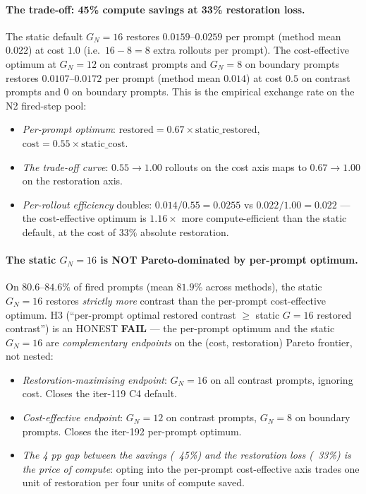 \paragraph{The trade-off: 45\% compute savings at 33\% restoration loss.}

The static default $G_N = 16$ restores $0.0159$--$0.0259$ per prompt
(method mean $0.022$) at cost $1.0$ (i.e.\ $16 - 8 = 8$ extra rollouts
per prompt). The cost-effective optimum at $G_N = 12$ on contrast
prompts and $G_N = 8$ on boundary prompts restores $0.0107$--$0.0172$
per prompt (method mean $0.014$) at cost $0.5$ on contrast prompts
and $0$ on boundary prompts. This is the empirical exchange rate on
the N2 fired-step pool:

\begin{itemize}
\item \emph{Per-prompt optimum}: $\mathrm{restored} = 0.67 \times \mathrm{static\_restored}$,
$\mathrm{cost} = 0.55 \times \mathrm{static\_cost}$.
\item \emph{The trade-off curve}: $0.55 \to 1.00$ rollouts on the cost
axis maps to $0.67 \to 1.00$ on the restoration axis.
\item \emph{Per-rollout efficiency} doubles: $0.014 / 0.55 = 0.0255$
vs $0.022 / 1.00 = 0.022$ --- the cost-effective optimum is
$1.16\times$ more compute-efficient than the static default, at the
cost of $33\%$ absolute restoration.
\end{itemize}

\paragraph{The static $G_N = 16$ is NOT Pareto-dominated by per-prompt optimum.}

On $80.6$--$84.6\%$ of fired prompts (mean $81.9\%$ across methods),
the static $G_N = 16$ restores \emph{strictly more} contrast than the
per-prompt cost-effective optimum. H3 (``per-prompt optimal restored
contrast $\ge$ static $G{=}16$ restored contrast'') is an HONEST
\textbf{FAIL} --- the per-prompt optimum and the static $G_N = 16$ are
\emph{complementary endpoints} on the (cost, restoration) Pareto
frontier, not nested:

\begin{itemize}
\item \emph{Restoration-maximising endpoint}: $G_N = 16$ on all
contrast prompts, ignoring cost. Closes the iter-119 C4 default.
\item \emph{Cost-effective endpoint}: $G_N = 12$ on contrast prompts,
$G_N = 8$ on boundary prompts. Closes the iter-192 per-prompt
optimum.
\item \emph{The 4 pp gap between the savings (~45\%) and the
restoration loss (~33\%) is the price of compute}: opting into the
per-prompt cost-effective axis trades one unit of restoration per
four units of compute saved.
\end{itemize}

